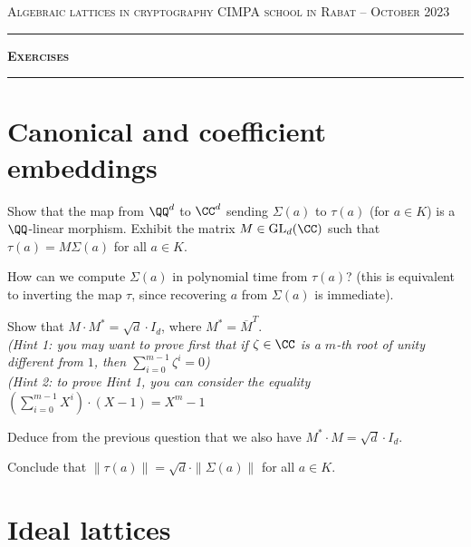\documentclass[11pt]{exam}
\theoremstyle{definition}
\begin{document}
{\noindent
   \textsc{Algebraic lattices in cryptography}
   \hfill {\textsc{CIMPA school in Rabat -- October 2023}}\\
  }
  \hrule
  \begin{center}
    {\Large\textbf{
   \textsc{Exercises}
    } } 
  \end{center}
  \hrule \vspace{5mm}

\thispagestyle{empty}

\vspace{0.2cm}


\section{Canonical and coefficient embeddings}

\begin{questions}
\question Show that the map from $\QQ^d$ to $\CC^d$ sending $\Sigma(a)$ to $\tau(a)$ (for $a \in K$) is a $\QQ$-linear morphism. Exhibit the matrix $M \in \mathrm{GL}_d(\CC)$ such that $\tau(a) = M \Sigma(a)$ for all $a \in K$.

\question How can we compute $\Sigma(a)$ in polynomial time from $\tau(a)$? (this is equivalent to inverting the map $\tau$, since recovering $a$ from $\Sigma(a)$ is immediate).

\question Show that $M \cdot M^* = \sqrt{d} \cdot I_d$, where $M^* = \overline{M}^T$.\\
\textit{\color{gray}(Hint 1: you may want to prove first that if $\zeta \in \CC$ is a $m$-th root of unity different from $1$, then $\sum_{i = 0}^{m-1} \zeta^i = 0$)} \\
\textit{\color{gray}(Hint 2: to prove Hint 1, you can consider the equality $(\sum_{i = 0}^{m-1} X^i) \cdot (X-1) = X^m-1$}

\question Deduce from the previous question that we also have $M^* \cdot M = \sqrt{d} \cdot I_d$.

\question Conclude that $\|\tau(a)\| = \sqrt{d} \cdot \|\Sigma(a)\|$ for all $a \in K$.

\end{questions}

\section{Ideal lattices}
\label{exo:id-lat}

\end{document}
